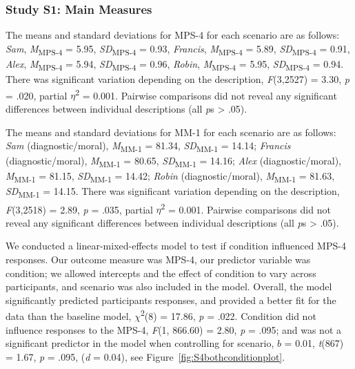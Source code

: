 \documentclass[
  man,floatsintext]{apa6}
\begin{document}
\subsubsection{Study S1: Main Measures}\label{study-s1-main-measures}

The means and standard deviations for MPS-4 for each scenario are as follows:
\emph{Sam},
\emph{M}\textsubscript{MPS-4} = 5.95, \emph{SD}\textsubscript{MPS-4} = 0.93,
\emph{Francis},
\emph{M}\textsubscript{MPS-4} = 5.89, \emph{SD}\textsubscript{MPS-4} = 0.91,
\emph{Alex},
\emph{M}\textsubscript{MPS-4} = 5.94, \emph{SD}\textsubscript{MPS-4} = 0.96,
\emph{Robin},
\emph{M}\textsubscript{MPS-4} = 5.95, \emph{SD}\textsubscript{MPS-4} = 0.94. There was significant variation depending on the description, \emph{F}(3,2527) = 3.30, \emph{p} = .020, partial \(\eta\)\textsuperscript{2} = 0.001. Pairwise comparisons did not reveal any significant differences between individual descriptions (all \emph{p}s \textgreater{} .05).

The means and standard deviations for MM-1 for each scenario are as follows:
\emph{Sam} (diagnostic/moral),
\emph{M}\textsubscript{MM-1} = 81.34, \emph{SD}\textsubscript{MM-1} = 14.14;
\emph{Francis} (diagnostic/moral),
\emph{M}\textsubscript{MM-1} = 80.65, \emph{SD}\textsubscript{MM-1} = 14.16;
\emph{Alex} (diagnostic/moral),
\emph{M}\textsubscript{MM-1} = 81.15, \emph{SD}\textsubscript{MM-1} = 14.42;
\emph{Robin} (diagnostic/moral),
\emph{M}\textsubscript{MM-1} = 81.63, \emph{SD}\textsubscript{MM-1} = 14.15. There was significant variation depending on the description, \emph{F}(3,2518) = 2.89, \emph{p} = .035, partial \(\eta\)\textsuperscript{2} = 0.001. Pairwise comparisons did not reveal any significant differences between individual descriptions (all \emph{p}s \textgreater{} .05).

We conducted a linear-mixed-effects model to test if condition influenced MPS-4 responses. Our outcome measure was MPS-4, our predictor variable was condition; we allowed intercepts and the effect of condition to vary across participants, and scenario was also included in the model.
Overall, the model significantly predicted participants responses, and provided a better fit for the data than the baseline model, \(\chi\)\textsuperscript{2}(8) = 17.86, \emph{p} = .022. Condition did not influence responses to the MPS-4, \emph{F}(1, 866.60) = 2.80, \emph{p} = .095; and was not a significant predictor in the model when controlling for scenario, \(b\) = 0.01, \emph{t}(867) = 1.67, \emph{p} = .095, (\emph{d} = 0.04), see Figure~\ref{fig:S4bothconditionplot}.
\end{document}
